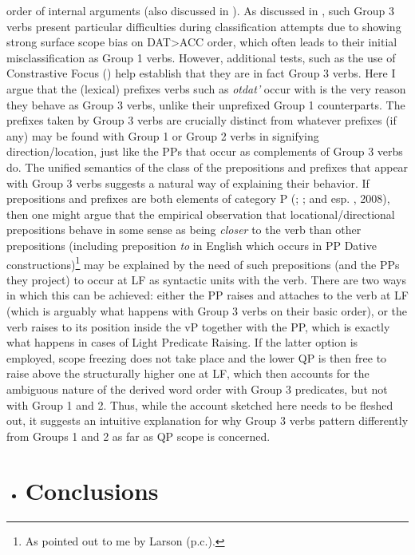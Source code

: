 \documentclass[output=paper,modfonts, nonflat]{langsci/langscibook}
\begin{document}
order of internal arguments (also discussed in \citealt{BonehNash2017}). As discussed in \citet{Antonyuk2015}, such Group 3 verbs present particular difficulties during classification attempts due to showing strong surface scope bias on DAT>ACC order, which often leads to their initial misclassification as Group 1 verbs. However, additional tests, such as the use of Constrastive Focus (\citealt{AntonyukLarson2016}) help establish that they are in fact Group 3 verbs. Here I argue that the (lexical) prefixes verbs such as \textit{otdat'} occur with is the very reason they behave as Group 3 verbs, unlike their unprefixed Group 1 counterparts. The prefixes taken by Group 3 verbs are crucially distinct from whatever prefixes (if any) may be found with Group 1 or Group 2 verbs in signifying direction/location, just like the PPs that occur as complements of Group 3 verbs do. The unified semantics of the class of the prepositions and prefixes that appear with Group 3 verbs suggests a natural way of explaining their behavior. If prepositions and prefixes are both elements of category P (\citealt{Matushansky2002}; \citealt{Biskup2017}; and esp. \citealt{Svenonius2004}, 2008), then one might argue that the empirical observation that locational/directional prepositions behave in some sense as being \textit{closer} to the verb than other prepositions (including preposition \textit{to} in English which occurs in PP Dative constructions)\footnote{As pointed out to me by Larson (p.c.).} may be explained by the need of such prepositions (and the PPs they project) to occur at LF as syntactic units with the verb. There are two ways in which this can be achieved: either the PP raises and attaches to the verb at LF (which is arguably what happens with Group 3 verbs on their basic order), or the verb raises to its position inside the vP together with the PP, which is exactly what happens in cases of Light Predicate Raising. If the latter option is employed, scope freezing does not take place and the lower QP is then free to raise above the structurally higher one at LF, which then accounts for the ambiguous nature of the derived word order with Group 3 predicates, but not with Group 1 and 2. Thus, while the account sketched here needs to be fleshed out, it suggests an intuitive explanation for why Group 3 verbs pattern differently from Groups 1 and 2 as far as QP scope is concerned.

\begin{itemize}
\item \section{Conclusions}
\end{itemize}
\end{document}
